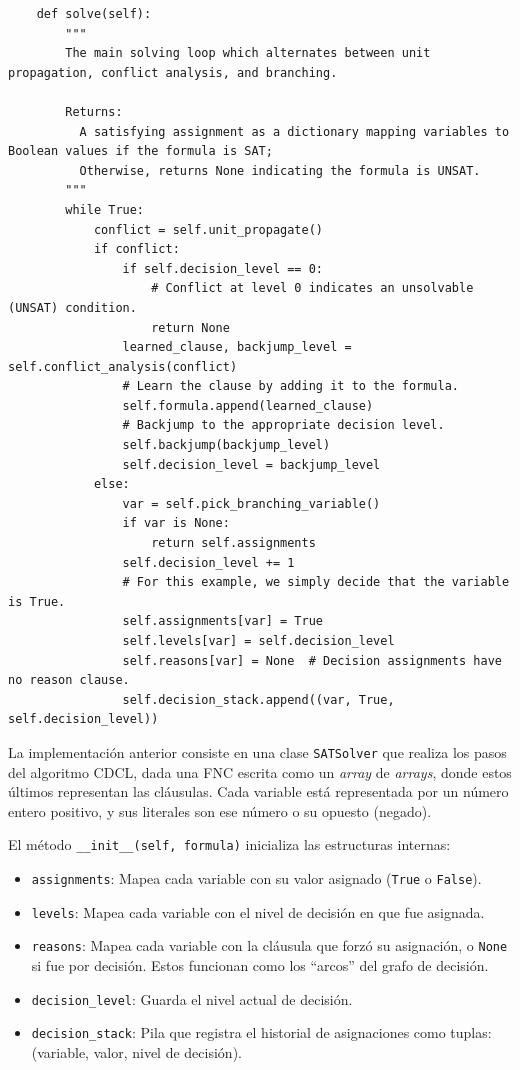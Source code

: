 \begin{lstlisting}
    def solve(self):
        """
        The main solving loop which alternates between unit propagation, conflict analysis, and branching.
        
        Returns:
          A satisfying assignment as a dictionary mapping variables to Boolean values if the formula is SAT;
          Otherwise, returns None indicating the formula is UNSAT.
        """
        while True:
            conflict = self.unit_propagate()
            if conflict:
                if self.decision_level == 0:
                    # Conflict at level 0 indicates an unsolvable (UNSAT) condition.
                    return None
                learned_clause, backjump_level = self.conflict_analysis(conflict)
                # Learn the clause by adding it to the formula.
                self.formula.append(learned_clause)
                # Backjump to the appropriate decision level.
                self.backjump(backjump_level)
                self.decision_level = backjump_level
            else:
                var = self.pick_branching_variable()
                if var is None:
                    return self.assignments
                self.decision_level += 1
                # For this example, we simply decide that the variable is True.
                self.assignments[var] = True
                self.levels[var] = self.decision_level
                self.reasons[var] = None  # Decision assignments have no reason clause.
                self.decision_stack.append((var, True, self.decision_level))
\end{lstlisting}

La implementación anterior consiste en una clase \texttt{SATSolver} que realiza los pasos del algoritmo CDCL, dada una FNC escrita como un \textit{array} de \textit{arrays}, donde estos últimos representan las cláusulas. Cada variable está representada por un número entero positivo, y sus literales son ese número o su opuesto (negado).

El método \texttt{\_\_init\_\_(self, formula)} inicializa las estructuras internas:
\begin{itemize}
  \item \texttt{assignments}: Mapea cada variable con su valor asignado (\texttt{True} o \texttt{False}).
  \item \texttt{levels}: Mapea cada variable con el nivel de decisión en que fue asignada.
  \item \texttt{reasons}: Mapea cada variable con la cláusula que forzó su asignación, o \texttt{None} si fue por decisión. Estos funcionan como los ``arcos'' del grafo de decisión.
  \item \texttt{decision\_level}: Guarda el nivel actual de decisión.
  \item \texttt{decision\_stack}: Pila que registra el historial de asignaciones como tuplas: (variable, valor, nivel de decisión).
\end{itemize}

